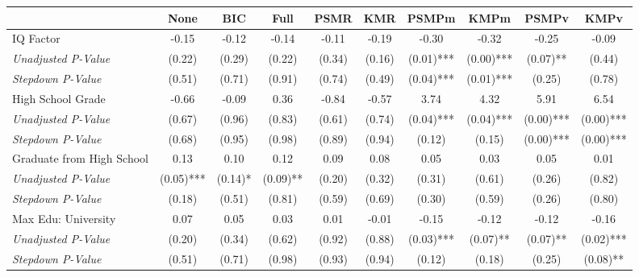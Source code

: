 \begin{tabular}{l c c c c c c c c c}
\toprule
 & None & BIC & Full & PSMR & KMR & PSMPm & KMPm & PSMPv & KMPv \\
\midrule
IQ Factor & -0.15 & -0.12 & -0.14 & -0.11 & -0.19 & -0.30 & -0.32 & -0.25 & -0.09 \\
\quad \textit{Unadjusted P-Value} & (0.22) & (0.29) & (0.22) & (0.34) & (0.16) & (0.01)*** & (0.00)*** & (0.07)** & (0.44) \\
\quad \textit{Stepdown P-Value} & (0.51) & (0.71) & (0.91) & (0.74) & (0.49) & (0.04)*** & (0.01)*** & (0.25) & (0.78) \\
High School Grade & -0.66 & -0.09 & 0.36 & -0.84 & -0.57 & 3.74 & 4.32 & 5.91 & 6.54 \\
\quad \textit{Unadjusted P-Value} & (0.67) & (0.96) & (0.83) & (0.61) & (0.74) & (0.04)*** & (0.04)*** & (0.00)*** & (0.00)*** \\
\quad \textit{Stepdown P-Value} & (0.68) & (0.95) & (0.98) & (0.89) & (0.94) & (0.12) & (0.15) & (0.00)*** & (0.00)*** \\
Graduate from High School & 0.13 & 0.10 & 0.12 & 0.09 & 0.08 & 0.05 & 0.03 & 0.05 & 0.01 \\
\quad \textit{Unadjusted P-Value} & (0.05)*** & (0.14)* & (0.09)** & (0.20) & (0.32) & (0.31) & (0.61) & (0.26) & (0.82) \\
\quad \textit{Stepdown P-Value} & (0.18) & (0.51) & (0.81) & (0.59) & (0.69) & (0.30) & (0.59) & (0.26) & (0.80) \\
Max Edu: University & 0.07 & 0.05 & 0.03 & 0.01 & -0.01 & -0.15 & -0.12 & -0.12 & -0.16 \\
\quad \textit{Unadjusted P-Value} & (0.20) & (0.34) & (0.62) & (0.92) & (0.88) & (0.03)*** & (0.07)** & (0.07)** & (0.02)*** \\
\quad \textit{Stepdown P-Value} & (0.51) & (0.71) & (0.98) & (0.93) & (0.94) & (0.12) & (0.18) & (0.25) & (0.08)** \\
\bottomrule
\end{tabular}
